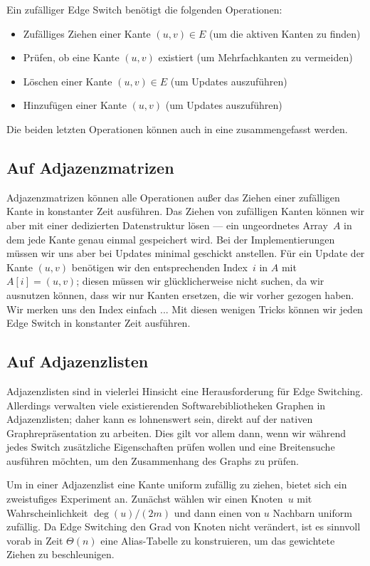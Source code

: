 Ein zufälliger Edge Switch benötigt die folgenden Operationen:
\begin{itemize}
    \item Zufälliges Ziehen einer Kante $(u,v) \in E$ (um die aktiven Kanten zu finden)
    \item Prüfen, ob eine Kante $(u, v)$ existiert (um Mehrfachkanten zu vermeiden)
    \item Löschen einer Kante $(u, v) \in E$ (um Updates auszuführen)
    \item Hinzufügen einer Kante $(u, v)$ (um Updates auszuführen)
\end{itemize}

Die beiden letzten Operationen können auch in eine zusammengefasst werden.

\subsection{Auf Adjazenzmatrizen}
Adjazenzmatrizen können alle Operationen außer das Ziehen einer zufälligen Kante in konstanter Zeit ausführen.
Das Ziehen von zufälligen Kanten können wir aber mit einer dedizierten Datenstruktur lösen ---
\zB ein ungeordnetes Array~$A$ in dem jede Kante genau einmal gespeichert wird.
Bei der Implementierungen müssen wir uns aber bei Updates minimal geschickt anstellen.
Für ein Update der Kante $(u,v)$ benötigen wir den entsprechenden Index~$i$ in $A$ mit $A[i] = (u,v)$;
diesen müssen wir glücklicherweise nicht suchen, da wir ausnutzen können, dass wir nur Kanten ersetzen, die wir vorher gezogen haben.
Wir merken uns den Index einfach ...
Mit diesen wenigen Tricks können wir jeden Edge Switch in konstanter Zeit ausführen.

\subsection{Auf Adjazenzlisten}
Adjazenzlisten sind in vielerlei Hinsicht eine Herausforderung für Edge Switching.
Allerdings verwalten viele existierenden Softwarebibliotheken Graphen in Adjazenzlisten; daher kann es lohnenswert sein, direkt auf der nativen Graphrepräsentation zu arbeiten.
Dies gilt vor allem dann, wenn wir während jedes Switch zusätzliche Eigenschaften prüfen wollen und \zB eine Breitensuche ausführen möchten, um den Zusammenhang des Graphs zu prüfen.

Um in einer Adjazenzlist eine Kante uniform zufällig zu ziehen, bietet sich ein zweistufiges Experiment an.
Zunächst wählen wir einen Knoten~$u$ mit Wahrscheinlichkeit $\deg(u) / (2m)$ und dann einen von $u$ Nachbarn uniform zufällig.
Da Edge Switching den Grad von Knoten nicht verändert, ist es sinnvoll vorab in Zeit $\Theta(n)$ eine Alias-Tabelle zu konstruieren, um das gewichtete Ziehen zu beschleunigen.

